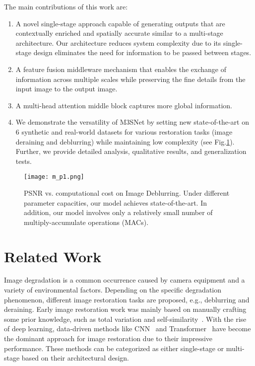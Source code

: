 \documentclass[sn-mathphys,Numbered]{sn-jnl}
\theoremstyle{thmstyleone}\newtheorem{theorem}{Theorem}\newtheorem{proposition}[theorem]{Proposition}
\theoremstyle{thmstyletwo}\newtheorem{example}{Example}\newtheorem{remark}{Remark}
\theoremstyle{thmstylethree}\newtheorem{definition}{Definition}
\begin{document}
The main contributions of this work are:
\begin{enumerate}
\item A novel single-stage approach capable of generating outputs that are contextually enriched and spatially accurate similar to a multi-stage architecture. Our architecture reduces system complexity due to its single-stage design eliminates the need for information to be passed between stages.
\item A feature fusion middleware mechanism that enables the exchange of information across multiple scales while preserving the fine details from the input image to the output image.
\item A multi-head attention middle block captures more global information. 
\item We demonstrate the versatility of M3SNet by setting new state-of-the-art on 6 synthetic and real-world datasets for various restoration tasks (image deraining and deblurring) while maintaining low complexity (see Fig.\ref{fig:01}). Further, we provide detailed analysis, qualitative results, and generalization tests.
\end {enumerate}
\begin{figure}[t] \centering
	\texttt{[image: m\_p1.png]}
	\caption{PSNR vs. computational cost on Image Deblurring. Under different parameter capacities, our model achieves state-of-the-art. In addition, our model involves only a relatively small number of multiply-accumulate operations (MACs).}
	\label{fig:01}
\end{figure}

\section{Related Work}
Image degradation is a common occurrence caused by camera equipment and a variety of environmental factors. Depending on the specific degradation phenomenon, different image restoration tasks are proposed, e.g., deblurring and deraining. Early image restoration work was mainly based on manually crafting some prior knowledge, such as total variation and self-similarity~\cite{1992Nonlinear, 1997Prior, 2002Scale, 2005Fields, 2010Single, 2011Image, 2011Single}. With the rise of deep learning, data-driven methods like CNN~\cite{r7anwar2019drln,r105zhang2018rcan,r107zhang2020rdnir,r18dudhane2021burst,Zamir2021MPRNet,Zamir2022MIRNetv2} and Transformer~\cite{conde2022swin2sr,liang2021swinir,Zamir2021Restormer,Tsai2022Stripformer,Wang_2022_CVPR} have become the dominant approach for image restoration due to their impressive performance. These methods can be categorized as either single-stage or multi-stage based on their architectural design.
\end{document}
